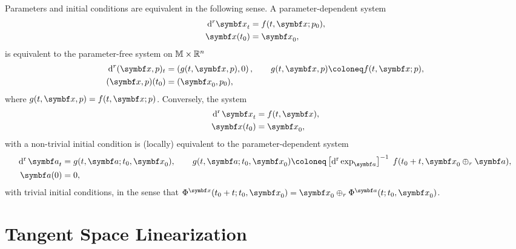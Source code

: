\begin{remark}
  \label{remark:parameter_initial}
  Parameters and initial conditions are equivalent in the following sense. A parameter-dependent system
  \begin{equation}
    \begin{aligned}
      \mathrm{d}^r \x_t & = f(t, \x; p_{0}), \\
      \x(t_{0})         & = \x_{0},
    \end{aligned}
  \end{equation}
  is equivalent to the parameter-free system on ${\mathbb{M}} \times \mathbb{R}^{n}$
  \begin{equation}
    \begin{aligned}
      \mathrm{d}^r (\x, p)_t & =  \left(g(t, \x, p), 0\right), \qquad g(t, \x, p) \coloneq f(t, \x; p), \\
      (\x, p)(t_{0})         & = (\x_0, p_{0}),
    \end{aligned}
  \end{equation}
  where $g(t, \x, p) = f(t, \x; p)$. Conversely, the system
  \begin{equation}
    \begin{aligned}
      \dr \x_{t} & = f(t, \x), \\
      \x(t_{0})  & = \x_{0},
    \end{aligned}
  \end{equation}
  with a non-trivial initial condition is (locally) equivalent to the parameter-dependent system
  \begin{equation}
    \begin{aligned}
      \dr \a_{t} & = g(t, \a; t_{0}, \x_{0}), \qquad g(t, \a; t_{0}, \x_{0}) \coloneq \left[ \dr \exp_{\a} \right]^{-1} \; f(t_{0} + t, \x_{0} \oplus_{r} \a), \\
      \a(0)      & = 0,
    \end{aligned}
  \end{equation}
  with trivial initial conditions, in the sense that $\Phi^{\x}(t_{0} + t; t_{0}, \x_{0}) = \x_{0} \oplus_{r} \Phi^{\a}(t; t_{0}, \x_{0})$.
\end{remark}

\section{Tangent Space Linearization}

